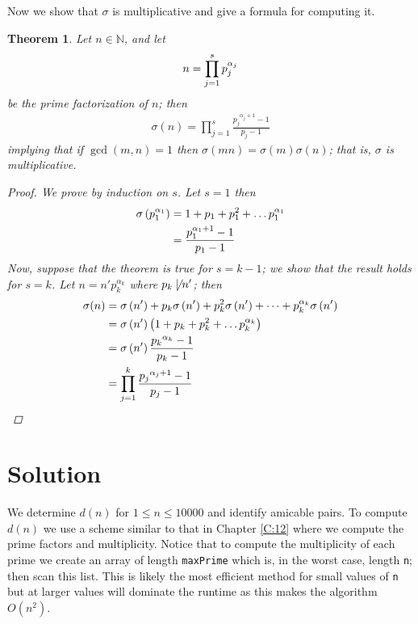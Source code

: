 \documentclass[oneside,12pt]{book}   	%
\newcounter{ex}
\newcounter{pr}
\newtheorem{thm}{Theorem}[chapter]
\theoremstyle{definition}
\newcommand{\paren}[1]{\left( #1 \right)}
\begin{document}
\begin{spacing}{1.618}
		Now we show that $\sigma$ is multiplicative and give a formula for computing it\cite{Andrews1971}. 
		\begin{thm}
			Let $n\in\mathbb{N}$, and let
			\begin{alignat}{4}
				n=\prod_{j=1}^s p_j^{\alpha_j} \notag
			\end{alignat}
			be the prime factorization of $n$; then
			\begin{alignat}{4}
				\sigma(n)=\prod_{j=1}^s \frac{{p_j}^{\alpha_j+1}-1}{p_j-1}
			\end{alignat}
			implying that if $\gcd{(m, n)}=1$ then $\sigma(mn)=\sigma(m)\sigma(n)$; that is, $\sigma$ is multiplicative. 
			\begin{proof}
				We prove by induction on $s$. Let $s=1$ then 
				\begin{alignat}{4}
					\sigma\left(p_1^{\alpha_1}\right)&=1+p_1+p_1^2+\dots p_1^{\alpha_1} \notag \\
						&=\frac{p_1^{\alpha_1+1}-1}{p_1-1}
				\end{alignat}
				Now, suppose that the theorem is true for $s=k-1$; we show that the result holds for $s=k$. Let $n=n' p_{k}^{\alpha_{k}}$ where $p_{k}\not\mid n'$; then 
				\begin{alignat}{4}
					\sigma(n)&=\sigma\left(n'\right)+p_{k}\sigma\left(n'\right)+p_{k}^2\sigma\left(n'\right)+\dots+p_{k}^{\alpha_{k}}\sigma\left(n'\right) \notag \\
						&=\sigma\left(n'\right)\left(1+p_{k}+p_{k}^2+\dots p_{k}^{\alpha_{k}}\right) \notag \\
						&=\sigma\left(n'\right) \frac{{p_{k}}^{\alpha_k}-1}{p_k-1} \notag \\
						&=\prod_{j=1}^{k} \frac{{p_j}^{\alpha_j+1}-1}{p_j-1} \notag
				\end{alignat}
			\end{proof}
		\end{thm}
		
		\section{Solution}
		
			We determine $d(n)$ for $1\leq n\leq 10000$ and identify amicable pairs. To compute $d(n)$ we use a scheme similar to that in Chapter \ref{C:12} where we compute the prime factors and multiplicity. Notice that to compute the multiplicity of each prime we create an array of length \texttt{maxPrime} which is, in the worst case, length \texttt{n}; then scan this list. This is likely the most efficient method for small values of \texttt{n} but at larger values will dominate the runtime as this makes the algorithm $O\paren{n^2}$. 
			

\end{spacing}
\end{document}
